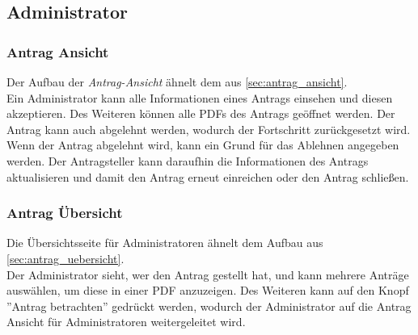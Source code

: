 \subsection{Administrator}
\subsubsection{Antrag Ansicht}
Der Aufbau der \textit{Antrag-Ansicht} ähnelt dem aus \autoref{sec:antrag_ansicht}.\\
Ein Administrator kann alle Informationen eines Antrags einsehen und diesen akzeptieren. Des Weiteren können alle PDFs des Antrags geöffnet werden. Der Antrag kann auch abgelehnt werden, wodurch der Fortschritt zurückgesetzt wird. Wenn der Antrag abgelehnt wird, kann ein Grund für das Ablehnen angegeben werden. Der Antragsteller kann daraufhin die Informationen des Antrags aktualisieren und damit den Antrag erneut einreichen oder den Antrag schließen.
\subsubsection{Antrag Übersicht}
Die Übersichtsseite für Administratoren ähnelt dem Aufbau aus \autoref{sec:antrag_uebersicht}.\\
Der Administrator sieht, wer den Antrag gestellt hat, und kann mehrere Anträge auswählen, um diese in einer PDF anzuzeigen.
Des Weiteren kann auf den Knopf ''Antrag betrachten'' gedrückt werden, wodurch der Administrator auf die Antrag Ansicht für Administratoren weitergeleitet wird.
\newpage
